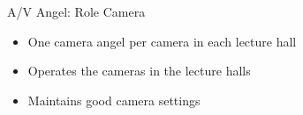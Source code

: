 
\begin{frame}{A/V Angel: Role Camera}
	\begin{itemize}
		\item One camera angel per camera in each lecture hall
		\item Operates the cameras in the lecture halls
		\item Maintains good camera settings
	\end{itemize}
\end{frame}
